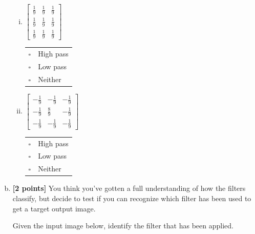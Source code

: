 \begin{enumerate}[(a)]
\begin{enumerate}[(i)]
\item
 $\begin{bmatrix}
    \frac{1}{9} & \frac{1}{9} & \frac{1}{9} \\
    \frac{1}{9} & \frac{1}{9} & \frac{1}{9} \\
    \frac{1}{9} & \frac{1}{9} & \frac{1}{9}
 \end{bmatrix}$
\begin{tabular}[h]{ll}
$\square$ & High pass \\
$\square$ & Low pass \\
$\square$ & Neither \\
\end{tabular}

\item
$\begin{bmatrix}
    -\frac{1}{9} & -\frac{1}{9} & -\frac{1}{9} \\
    -\frac{1}{9} & \frac{8}{9} & -\frac{1}{9} \\
    -\frac{1}{9} & -\frac{1}{9} & -\frac{1}{9}
  \end{bmatrix}$
\begin{tabular}[h]{ll}
$\square$ & High pass \\
$\square$ & Low pass \\
$\square$ & Neither \\
\end{tabular}
\end{enumerate}

\item \textbf{[2 points]}
You think you've gotten a full understanding of how the filters classify, but decide to test if you can recognize which filter has been used to get a target output image. 

\begin{tcolorbox}[colback=orange!5!white,colframe=orange!75!black]
Given the input image below, identify the filter that has been applied.
\end{tcolorbox}



\end{enumerate}
